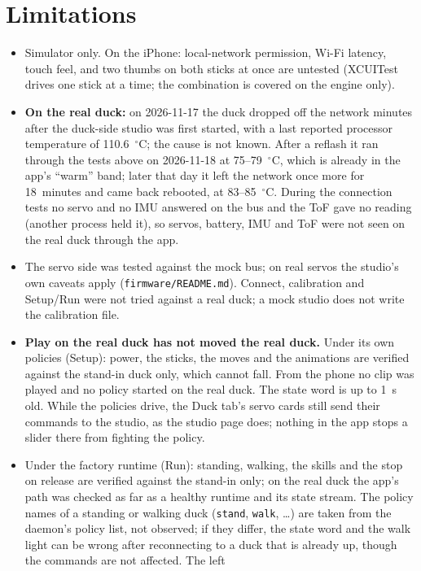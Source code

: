 \documentclass[11pt]{article}
\begin{document}
\section{Limitations}
\begin{itemize}\itemsep0pt
\item Simulator only. On the iPhone: local-network permission, Wi-Fi latency, touch feel, and two thumbs on both
sticks at once are untested (XCUITest drives one stick at a time; the combination is covered on the engine only).
\item \textbf{On the real duck:} on 2026-11-17 the duck dropped off the network minutes after the duck-side studio
was first started, with a last reported processor temperature of 110.6~$^\circ$C; the cause is not known. After a
reflash it ran through the tests above on 2026-11-18 at 75--79~$^\circ$C, which is already in the app's ``warm''
band; later that day it left the network once more for 18~minutes and came back rebooted, at 83--85~$^\circ$C. During the connection tests no servo and no IMU answered on the bus and the ToF gave no reading (another process held
it), so servos, battery, IMU and ToF were not seen on the real duck through the app.
\item The servo side was tested against the mock bus; on real servos the studio's own caveats apply
(\texttt{firmware/README.md}). Connect, calibration and Setup/Run were not tried against a real duck; a mock
studio does not write the calibration file.
\item \textbf{Play on the real duck has not moved the real duck.} Under its own policies (Setup): power, the
sticks, the moves and the animations are verified against the stand-in duck only, which cannot fall. From the phone
no clip was played and no policy started on the real duck. The state word is up to 1~s old. While the policies
drive, the Duck tab's servo cards still send their commands to the studio, as the studio page does; nothing in the
app stops a slider there from fighting the policy.
\item Under the factory runtime (Run): standing, walking, the skills and the stop on
release are verified against the stand-in only; on the real duck the app's path was checked as far as a healthy
runtime and its state stream. The policy names of a standing or walking duck (\texttt{stand}, \texttt{walk}, \ldots)
are taken from the daemon's policy list, not observed; if they differ, the state word and the walk light can be
wrong after reconnecting to a duck that is already up, though the commands are not affected. The left

\end{itemize}
\end{document}
